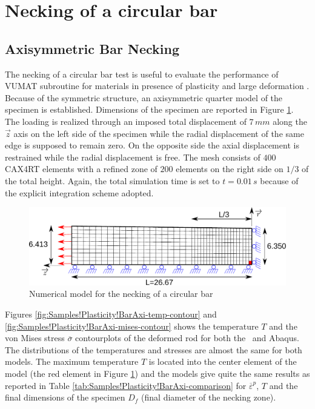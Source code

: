 \section{Necking of a circular bar}

\subsection{Axisymmetric Bar Necking}

The necking of a circular bar test is useful to evaluate the performance
of VUMAT subroutine for materials in presence of plasticity and large
deformation \cite{ponthot_unified_2002, j_c_simo_computational_1998}. Because of the symmetric
structure, an axisymmetric quarter model of the specimen is established.
Dimensions of the specimen are reported in Figure \ref{fig:Samples!Plasticity!NeckingAxi}.
The loading is realized through an imposed total displacement of $7\,mm$
along the $\overrightarrow{z}$ axis on the left side of the specimen
while the radial displacement of the same edge is supposed to remain
zero. On the opposite side the axial displacement is restrained while
the radial displacement is free. The mesh consists of $400$ CAX4RT
elements with a refined zone of $200$ elements on the right side
on $1/3$ of the total height. Again, the total simulation time is
set to $t=0.01\,s$ because of the explicit integration scheme adopted. 

\begin{figure}[h]
\begin{centering}
\includegraphics[width=0.75\columnwidth]{Figures/BarNecking}
\par\end{centering}
\caption{Numerical model for the necking of a circular bar\label{fig:Samples!Plasticity!NeckingAxi}}
\end{figure}

Figures \ref{fig:Samples!Plasticity!BarAxi-temp-contour} and \ref{fig:Samples!Plasticity!BarAxi-mises-contour}
shows the temperature $T$ and the von Mises stress $\overline{\sigma}$
contourplots of the deformed rod for both the \DynELA~and Abaqus.
The distributions of the temperatures and stresses are almost the
same for both models. The maximum temperature $T$ is located into
the center element of the model (the red element in Figure \ref{fig:Samples!Plasticity!NeckingAxi})
and the models give quite the same results as reported in Table \ref{tab:Samples!Plasticity!BarAxi-comparison}
for $\overline{\varepsilon}^{p}$, $T$ and the final dimensions of
the specimen $D_{f}$ (final diameter of the necking zone). 

